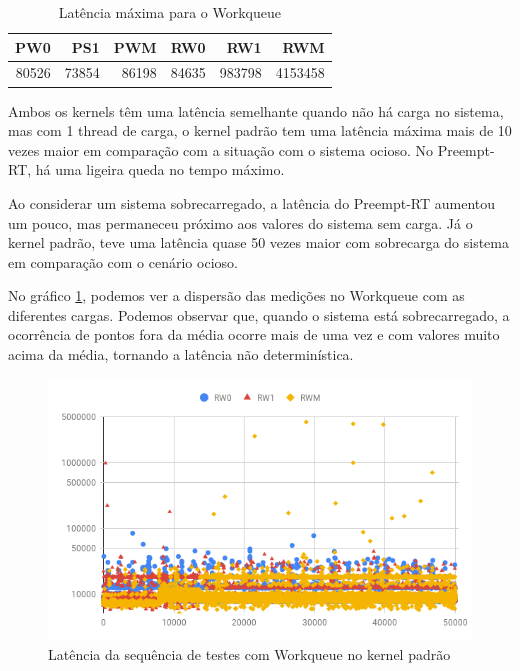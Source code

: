 \begin{table}[!htb]
    \centering
    \begin{center}
        \begin{tabular}{|r|r|r|r|r|r|}
            \toprule
                PW0 &    PS1 &    PWM &    RW0 &     RW1 &    RWM \\
            \midrule
                80526 &  73854 &  86198 & 84635 &  983798 &  4153458 \\
            \bottomrule
        \end{tabular}
    \end{center}
    \caption{Latência máxima para o Workqueue}
    \label{table:max-workqueue}
\end{table}

Ambos os kernels têm uma latência semelhante quando não há carga no sistema, mas com 1 thread de carga, o kernel padrão tem uma latência máxima mais de 10 vezes maior em comparação com a situação com o sistema ocioso. No Preempt-RT, há uma ligeira queda no tempo máximo.

Ao considerar um sistema sobrecarregado, a latência do Preempt-RT aumentou um pouco, mas permaneceu próximo aos valores do sistema sem carga. Já o kernel padrão, teve uma latência quase 50 vezes maior com sobrecarga do sistema em comparação com o cenário ocioso.

No gráfico \ref{grafico:r-workqueue}, podemos ver a dispersão das medições no Workqueue com as diferentes cargas. Podemos observar que, quando o sistema está sobrecarregado, a ocorrência de pontos fora da média ocorre mais de uma vez e com valores muito acima da média, tornando a latência não determinística.

\begin{figure}[!htb]
    \centering
    \includegraphics[width=\textwidth]{graficos/rw-scatter.png}
    \caption{Latência da sequência de testes com Workqueue no kernel padrão}
    \label{grafico:r-workqueue}
\end{figure}

